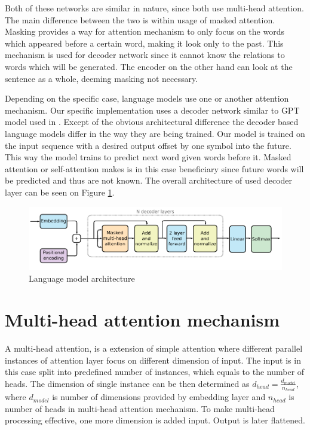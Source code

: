 Both of these networks are similar in nature, since both use multi-head attention. The main difference between the two is within usage of masked attention. Masking provides a way for attention mechanism to only focus on the words which appeared before a certain word, making it look only to the past. This mechanism is used for decoder network since it cannot know the relations to words which will be generated. The encoder on the other hand can look at the sentence as a whole, deeming masking not necessary.

Depending on the specific case, language models use one or another attention mechanism. Our specific implementation uses a decoder network similar to GPT model used in \cite{radford2018improving:gpt}. Except of the obvious architectural difference the decoder based language models differ in the way they are being trained. Our model is trained on the input sequence with a desired output offset by one symbol into the future. This way the model trains to predict next word given words before it. Masked attention or self-attention makes is in this case beneficiary since future words will be predicted and thus are not known. The overall architecture of used decoder layer can be seen on Figure \ref{fig:architecture}.

\begin{figure}[h]
    \centering
    \includegraphics{obrazky/language_model_architecture.pdf}
    \caption{Language model architecture}
    \label{fig:architecture}
\end{figure}

\section{Multi-head attention mechanism}
\label{sec:mha}

A multi-head attention, is a extension of simple attention where different parallel instances of attention layer focus on different dimension of input. The input is in this case split into predefined number of instances, which equals to the number of heads. The dimension of single instance can be then determined as $d_{head} = {\frac{d_{model}}{n_{head}}}$, where $d_{model}$ is number of dimensions provided by embedding layer and $n_{head}$ is number of heads in multi-head attention mechanism. To make multi-head processing effective, one more dimension is added input. Output is later flattened.

